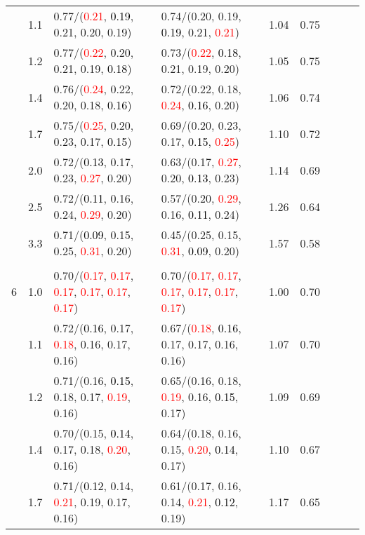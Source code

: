 \documentclass[10pt,a4paper]{report}
\begin{document}
\begin{table}[!htbp]
\begin{center}
{\begin{tabular}{ccllccccc}
			&1.1&0.77/(\textcolor{red}{0.21}, \textcolor{black}{0.19}, 0.21, 0.20, 0.19)&0.74/(0.20, 0.19, \textcolor{black}{0.19}, 0.21, \textcolor{red}{0.21})&1.04&0.75\\
			&1.2&0.77/(\textcolor{red}{0.22}, 0.20, 0.21, 0.19, \textcolor{black}{0.18})&0.73/(\textcolor{red}{0.22}, \textcolor{black}{0.18}, 0.21, 0.19, 0.20)&1.05&0.75\\
			&1.4&0.76/(\textcolor{red}{0.24}, 0.22, 0.20, 0.18, \textcolor{black}{0.16})&0.72/(0.22, 0.18, \textcolor{red}{0.24}, \textcolor{black}{0.16}, 0.20)&1.06&0.74\\
			&1.7&0.75/(\textcolor{red}{0.25}, 0.20, 0.23, 0.17, \textcolor{black}{0.15})&0.69/(0.20, 0.23, 0.17, \textcolor{black}{0.15}, \textcolor{red}{0.25})&1.10&0.72\\
			&2.0&0.72/(\textcolor{black}{0.13}, 0.17, 0.23, \textcolor{red}{0.27}, 0.20)&0.63/(0.17, \textcolor{red}{0.27}, 0.20, \textcolor{black}{0.13}, 0.23)&1.14&0.69\\
			&2.5&0.72/(\textcolor{black}{0.11}, 0.16, 0.24, \textcolor{red}{0.29}, 0.20)&0.57/(0.20, \textcolor{red}{0.29}, 0.16, \textcolor{black}{0.11}, 0.24)&1.26&0.64\\
			&3.3&0.71/(\textcolor{black}{0.09}, 0.15, 0.25, \textcolor{red}{0.31}, 0.20)&0.45/(0.25, 0.15, \textcolor{red}{0.31}, \textcolor{black}{0.09}, 0.20)&1.57&0.58\\
			&&&&\\
			6			&1.0&0.70/(\textcolor{red}{0.17}, \textcolor{red}{0.17}, \textcolor{red}{0.17}, \textcolor{red}{0.17}, \textcolor{red}{0.17}, \textcolor{red}{0.17})&0.70/(\textcolor{red}{0.17}, \textcolor{red}{0.17}, \textcolor{red}{0.17}, \textcolor{red}{0.17}, \textcolor{red}{0.17}, \textcolor{red}{0.17})&1.00&0.70\\
			&1.1&0.72/(\textcolor{black}{0.16}, 0.17, \textcolor{red}{0.18}, 0.16, 0.17, 0.16)&0.67/(\textcolor{red}{0.18}, \textcolor{black}{0.16}, 0.17, 0.17, 0.16, 0.16)&1.07&0.70\\
			&1.2&0.71/(0.16, \textcolor{black}{0.15}, 0.18, 0.17, \textcolor{red}{0.19}, 0.16)&0.65/(0.16, 0.18, \textcolor{red}{0.19}, 0.16, \textcolor{black}{0.15}, 0.17)&1.09&0.69\\
			&1.4&0.70/(0.15, \textcolor{black}{0.14}, 0.17, 0.18, \textcolor{red}{0.20}, 0.16)&0.64/(0.18, 0.16, 0.15, \textcolor{red}{0.20}, \textcolor{black}{0.14}, 0.17)&1.10&0.67\\
			&1.7&0.71/(\textcolor{black}{0.12}, 0.14, \textcolor{red}{0.21}, 0.19, 0.17, 0.16)&0.61/(0.17, 0.16, 0.14, \textcolor{red}{0.21}, \textcolor{black}{0.12}, 0.19)&1.17&0.65\\

\end{tabular}}
\end{center}
\end{table}
\end{document}
